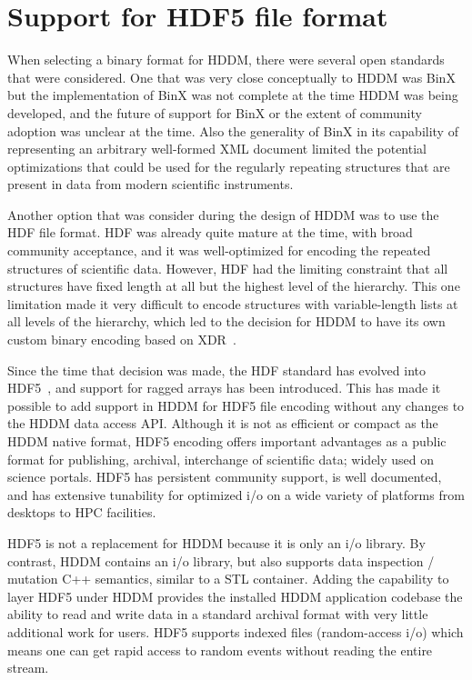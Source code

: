 \documentclass{revtex4}
\begin{document}
\section{Support for HDF5 file format}

When selecting a binary format for HDDM, there were several open standards
that were considered. One that was very close conceptually to HDDM was 
BinX~\cite{binx} but the implementation of BinX was not complete at the
time HDDM was being developed, and the future of support for BinX or the
extent of community adoption was unclear at the time. Also the generality
of BinX in its capability of representing an arbitrary well-formed XML
document limited the potential optimizations that could be used for the
regularly repeating structures that are present in data from modern
scientific instruments.

Another option that was consider during the design of HDDM was to use
the HDF file format. HDF was already quite mature at the time, with broad
community acceptance, and it was well-optimized for encoding the repeated
structures of scientific data. However, HDF had the limiting constraint
that all structures have fixed length at all but the highest level of
the hierarchy. This one limitation made it very difficult to encode
structures with variable-length lists at all levels of the hierarchy,
which led to the decision for HDDM to have its own custom binary encoding
based on XDR~\cite{xdr}.

Since the time that decision was made, the HDF standard has evolved into
HDF5~\cite{hdf5}, and support for ragged arrays has been introduced. This
has made it possible to add support in HDDM for HDF5 file encoding without
any changes to the HDDM data access API. Although it is not as efficient
or compact as the HDDM native format, HDF5 encoding offers important
advantages as a public format for publishing, archival, interchange of
scientific data; widely used on science portals. HDF5 has persistent
community support, is well documented, and has extensive tunability
for optimized i/o on a wide variety of platforms from desktops to HPC
facilities. 

HDF5 is not a replacement for HDDM because it is only an i/o library.
By contrast, HDDM contains an i/o library, but also supports data inspection
/ mutation C++ semantics, similar to a STL container. Adding the capability
to layer HDF5 under HDDM provides the installed HDDM application codebase
the ability to read and write data in a standard archival format with very
little additional work for users. HDF5 supports indexed files (random-access
i/o) which means one can get rapid access to random events without reading
the entire stream. 
\end{document}
